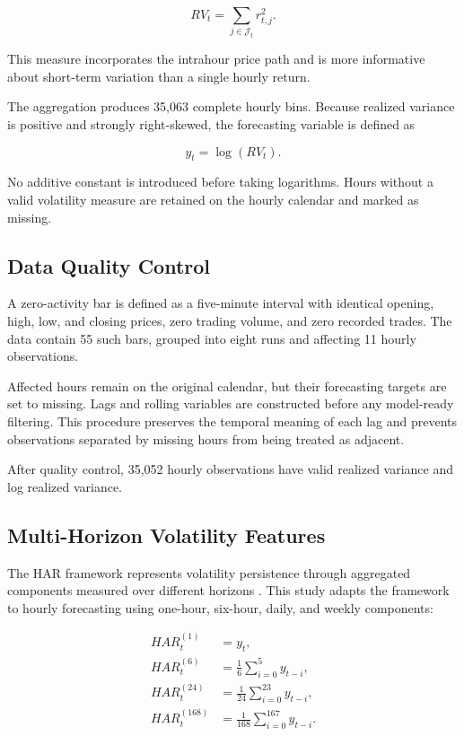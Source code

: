 \begin{equation}
RV_t
=
\sum_{j \in \mathcal{J}_t}
r_{t,j}^{2}.
\label{eq:realized-variance}
\end{equation}

This measure incorporates the intrahour price path and is more
informative about short-term variation than a single hourly
return.

The aggregation produces 35,063 complete hourly bins. Because
realized variance is positive and strongly right-skewed, the
forecasting variable is defined as

\begin{equation}
y_t
=
\log(RV_t).
\label{eq:log-rv}
\end{equation}

No additive constant is introduced before taking logarithms.
Hours without a valid volatility measure are retained on the
hourly calendar and marked as missing.

\subsection{Data Quality Control}

A zero-activity bar is defined as a five-minute interval with
identical opening, high, low, and closing prices, zero trading
volume, and zero recorded trades. The data contain 55 such
bars, grouped into eight runs and affecting 11 hourly
observations.

Affected hours remain on the original calendar, but their
forecasting targets are set to missing. Lags and rolling
variables are constructed before any model-ready filtering.
This procedure preserves the temporal meaning of each lag and
prevents observations separated by missing hours from being
treated as adjacent.

After quality control, 35,052 hourly observations have valid
realized variance and log realized variance.

\subsection{Multi-Horizon Volatility Features}

The HAR framework represents volatility persistence through
aggregated components measured over different horizons
\citep{corsi2009}. This study adapts the framework to hourly
forecasting using one-hour, six-hour, daily, and weekly
components:

\[
\begin{aligned}
HAR^{(1)}_t
&=
y_t,\\
HAR^{(6)}_t
&=
\frac{1}{6}
\sum_{i=0}^{5}
y_{t-i},\\
HAR^{(24)}_t
&=
\frac{1}{24}
\sum_{i=0}^{23}
y_{t-i},\\
HAR^{(168)}_t
&=
\frac{1}{168}
\sum_{i=0}^{167}
y_{t-i}.
\end{aligned}
\]


